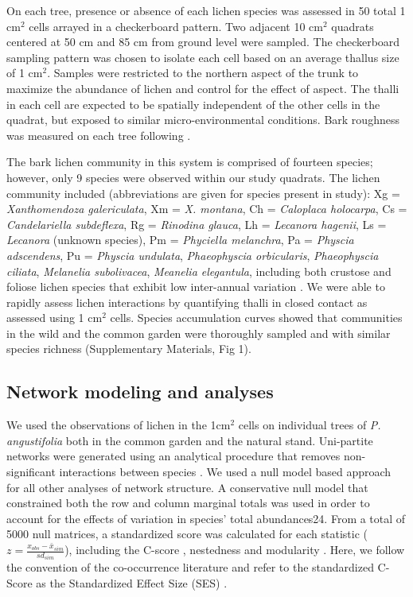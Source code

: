 \documentclass[fleqn,10pt]{wlscirep}
\begin{document}
On each tree, presence or absence of each lichen species was assessed
in 50 total 1 cm$^2$ cells arrayed in a checkerboard pattern. Two
adjacent 10 cm$^2$ quadrats centered at 50 cm and 85 cm from ground
level were sampled. The checkerboard sampling pattern was chosen to
isolate each cell based on an average thallus size of 1
cm$^2$. Samples were restricted to the northern aspect of the trunk to
maximize the abundance of lichen and control for the effect of
aspect. The thalli in each cell are expected to be spatially
independent of the other cells in the quadrat, but exposed to similar
micro-environmental conditions. Bark roughness was measured on each
tree following \cite{Winfree2011}.

The bark lichen community in this system is comprised of fourteen
species; however, only 9 species were observed within our study
quadrats. The lichen community included (abbreviations are given for
species present in study): Xg = \textit{Xanthomendoza galericulata},
Xm = \textit{X. montana}, Ch = \textit{Caloplaca holocarpa}, Cs =
\textit{Candelariella subdeflexa}, Rg = \textit{Rinodina glauca}, Lh =
\textit{Lecanora hagenii}, Ls = \textit{Lecanora} (unknown species),
Pm = \textit{Phyciella melanchra}, Pa = \textit{Physcia adscendens},
Pu = \textit{Physcia undulata}, \textit{Phaeophyscia orbicularis},
\textit{Phaeophyscia ciliata}, \textit{Melanelia subolivacea},
\textit{Meanelia elegantula}, including both crustose and foliose
lichen species that exhibit low inter-annual variation
\cite{Lamit2011}. We were able to rapidly assess lichen interactions
by quantifying thalli in closed contact as assessed using 1 cm$^2$
cells. Species accumulation curves showed that communities in the wild
and the common garden were thoroughly sampled and with similar species
richness (Supplementary Materials, Fig 1).


\subsection*{Network modeling and analyses}

We used the observations of lichen in the 1cm$^2$ cells on individual
trees of \textit{P. angustifolia} both in the common garden and the
natural stand. Uni-partite networks were generated using an analytical
procedure that removes non-significant interactions between species
\cite{Araujo2011}. We used a null model based approach for all other
analyses of network structure. A conservative null model that
constrained both the row and column marginal totals was used in order
to account for the effects of variation in species’ total
abundances24. From a total of 5000 null matrices, a standardized score
was calculated for each statistic ($z = \frac{x_{obs} -
  \bar{x}_{sim}}{sd_{sim}}$), including the C-score \cite{Stone1990a},
nestedness \cite{Atmar1993} and modularity \cite{Newman2006}. Here, we
follow the convention of the co-occurrence literature and refer to the
standardized C-Score as the Standardized Effect Size (SES)
\cite{Gotelli2001}.
\end{document}
